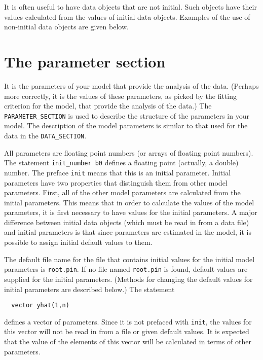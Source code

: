 \documentclass{admbmanual}
\newcommand\DS{\texttt{DATA\_SECTION}}
\begin{document}
It is often useful to have data objects that are not initial. Such objects have
their values calculated from the values of initial data objects. Examples of the
use of non-initial data objects are given below.

\section{The parameter section}

It is the parameters of your model that provide the analysis of the data.
(Perhaps more correctly, it is the values of these parameters, as picked by the
fitting criterion for the model, that provide the analysis of the data.) The
\texttt{PARAMETER\_SECTION} is used to describe the structure of the parameters
in your model. The description of the model parameters is similar to that used
for the data in the \DS.

All parameters are floating point numbers (or arrays of floating point numbers).
The statement \texttt{init\_number b0} defines a floating point (actually, a
double) number. The preface \texttt{init} means that this is an initial
parameter. Initial parameters have two properties that distinguish them from
other model parameters. First, all of the other model parameters are calculated
from the initial parameters. This means that in order to calculate the values of
the model parameters, it is first necessary to have values for the initial
parameters. A major difference between initial data objects (which must be read
in from a data file) and initial parameters is that since parameters are
estimated in the model, it is possible to assign initial default values to them.

The default file name for the file that contains initial values for the initial
model parameters is \texttt{root.pin}. If no file named \texttt{root.pin} is
found, default values are supplied for the initial parameters. (Methods for
changing the default values for initial parameters are described below.) The
statement
\begin{lstlisting}
  vector yhat(1,n)
\end{lstlisting}
defines a vector of parameters. Since it is not prefaced with \texttt{init}, the
values for this vector will not be read in from a file or given default values.
It is expected that the value of the elements of this vector will be calculated
in terms of other parameters.
\end{document}
